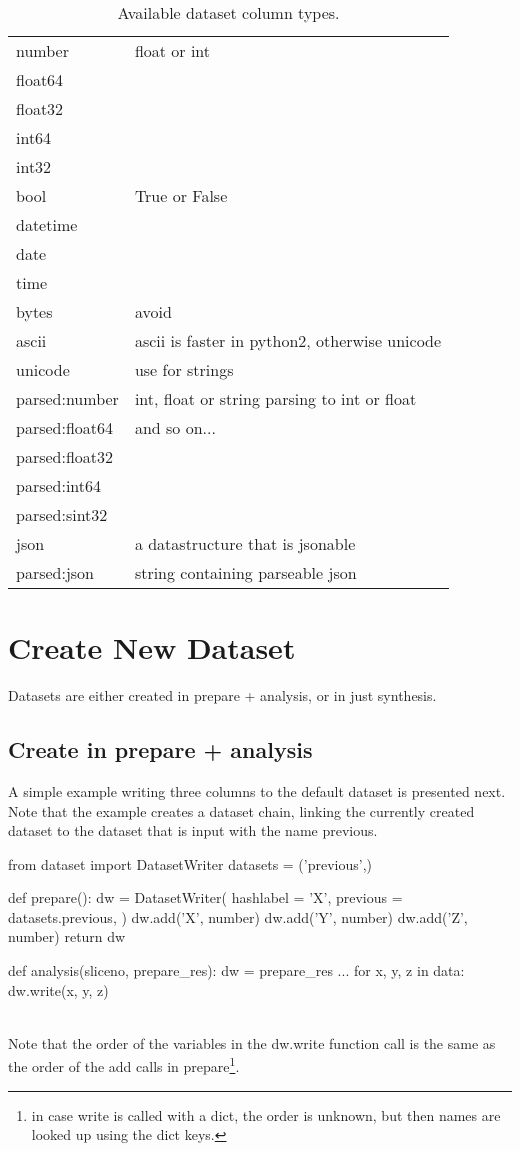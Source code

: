 \begin{table}[h!]
 \begin{tabular}{ll}
  \hline
    number   &  float or int\\
    float64   &\\
    float32   &\\
    int64   & \\
    int32   &  \\
    bool   &  True or False\\
    datetime   &  \\
    date   &  \\
    time   &  \\
    bytes   &  avoid \\
    ascii   &  ascii is faster in python2, otherwise unicode\\
    unicode   &  use for strings\\
    parsed:number   & int, float or string parsing to int or float \\
    parsed:float64   &  and so on...\\
    parsed:float32   &  \\
    parsed:int64   &  \\
    parsed:sint32   &  \\
    json   &  a datastructure that is jsonable\\
    parsed:json   &  string containing parseable json\\
  \hline
 \end{tabular}
 \caption{Available dataset column types.}
\end{table}

\newpage
\section{Create New Dataset}
Datasets are either created in prepare + analysis, or in just
synthesis.

\subsection{Create in prepare + analysis}
A simple example writing three columns to the default dataset is
presented next.  Note that the example creates a dataset chain,
linking the currently created dataset to the dataset that is input
with the name previous.

\begin{python}
from dataset import DatasetWriter
datasets = ('previous',)

def prepare():
  dw = DatasetWriter(
    hashlabel = 'X',
    previous = datasets.previous,
  )
  dw.add('X', number)
  dw.add('Y', number)
  dw.add('Z', number)
  return dw

def analysis(sliceno, prepare_res):
  dw = prepare_res
  ...
  for x, y, z in data:
    dw.write(x, y, z)
\end{python}
\\
Note that the order of the variables in the dw.write function call is
the same as the order of the add calls in prepare\footnote{in case
  write is called with a dict, the order is unknown, but then names
  are looked up using the dict keys.}.

